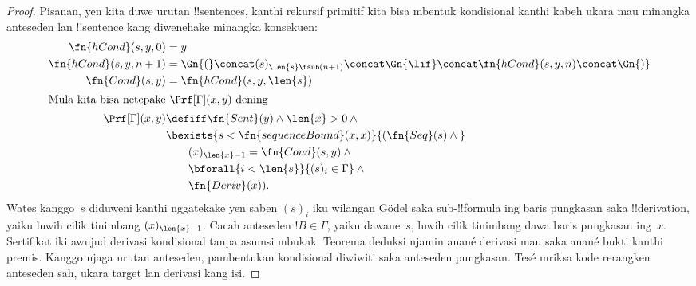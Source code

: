 \documentclass[../../../include/open-logic-section]{subfiles}
\begin{document}
\begin{proof}
Pisanan, yen kita duwe urutan !!{sentence}s, kanthi rekursif
primitif kita bisa mbentuk kondisional kanthi kabeh ukara mau
minangka anteseden lan !!{sentence} kang diwenehake minangka
konsekuen:
\begin{align*}
  \fn{hCond}(s, y, 0) & = y \\
  \fn{hCond}(s, y, n+1) & = \Gn{(} \concat (s)_{\len{s} \tsub (n+1)} \concat \Gn{\lif}
  \concat \fn{hCond}(s, y, n) \concat \Gn{)}\\
  \fn{Cond}(s, y) & = \fn{hCond}(s, y, \len{s})\\
  \intertext{Mula kita bisa netepake $\Prf[\Gamma](x, y)$ dening}
  \Prf[\Gamma](x, y) & \defiff \fn{Sent}(y) \land \len{x}>0 \land {}\\
  &\bexists{s < \fn{sequenceBound}(x,x)}{(\fn{Seq}(s) \land {}} \\
  &\qquad (x)_{\len{x}-1} = \fn{Cond}(s,y) \land {} \\
  &\qquad\bforall{i<\len{s}}{(s)_i \in \Gamma} \land {} \\
  &\qquad\fn{Deriv}(x)).
\end{align*}
Wates kanggo~$s$ diduweni kanthi nggatekake yen saben $(s)_i$
iku wilangan G\"odel saka sub-!!{formula} ing baris pungkasan
saka !!{derivation}, yaiku luwih cilik tinimbang
$(x)_{\len{x}-1}$. Cacah anteseden $!B \in \Gamma$, yaiku
dawane~$s$, luwih cilik tinimbang dawa baris pungkasan
ing~$x$.
Sertifikat iki awujud derivasi kondisional tanpa asumsi mbukak. Teorema deduksi njamin anané derivasi mau saka anané bukti kanthi premis. Kanggo njaga urutan anteseden, pambentukan kondisional diwiwiti saka anteseden pungkasan. Tesé mriksa kode rerangken anteseden sah, ukara target lan derivasi kang isi.
\end{proof}
\end{document}
